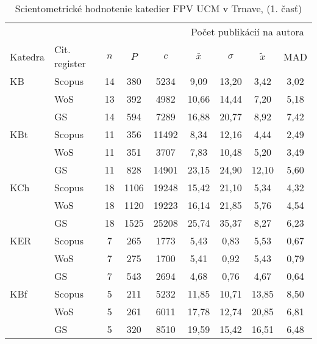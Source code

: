 \begin{table}
  \centering\small
  \caption[Hodnotenie FPV\,--\,počet publikácií na autora]{Scientometrické hodnotenie katedier FPV UCM v Trnave, (1. časť)}
  \label{tab:1-staff.results}
  \begin{tabularx}{\textwidth}{lXc@{\hspace{2.5em}}c@{\hspace{2.5em}}c@{\hspace{3.5em}}cccc}
  \toprule\noalign{\vspace{.3ex}}
         &        &   &     &      & \multicolumn{4}{c}{Počet publikácií na autora}  \\
 Katedra & Cit. register  & $n$   & $P$     &  $c$     & $\bar{x}$      & $\sigma$  & $\tilde{x}$   & MAD  \\[0.3ex]
\midrule\noalign{\vspace{.5ex}}
 KB   & Scopus & 14 & 380  & 5234  & 9,09          & 13,20 & 3,42  & 3,02 \\
      & WoS    & 13 & 392  & 4982  & 10,66         & 14,44 & 7,20  & 5,18 \\
      & GS     & 14 & 594  & 7289  & 16,88         & 20,77 & 8,92  & 7,42 \\[3ex]
 KBt  & Scopus & 11 & 356  & 11492 & 8,34          & 12,16 & 4,44  & 2,49 \\
      & WoS    & 11 & 351  & 3707  & 7,83          & 10,48 & 5,20  & 3,49 \\
      & GS     & 11 & 828  & 14901 & 23,15         & 24,90 & 12,10 & 5,60 \\[3ex]
 KCh  & Scopus & 18 & 1106 & 19248 & 15,42         & 21,10 & 5,34  & 4,32 \\
      & WoS    & 18 & 1120 & 19223 & 16,14         & 21,85 & 5,76  & 4,54 \\
      & GS     & 18 & 1525 & 25208 & 25,74         & 35,37 & 8,27  & 6,23 \\[3ex]
 KER  & Scopus & 7  & 265  & 1773  & 5,43          & 0,83  & 5,53  & 0,67 \\
      & WoS    & 7  & 275  & 1700  & 5,41          & 0,92  & 5,43  & 0,79 \\
      & GS     & 7  & 543  & 2694  & 4,68          & 0,76  & 4,67  & 0,64 \\[3ex]
 KBf  & Scopus & 5  & 211  & 5232  & 11,85         & 10,71 & 13,85 & 8,50 \\
      & WoS    & 5  & 261  & 6011  & 17,78         & 12,74 & 20,85 & 6,81 \\
      & GS     & 5  & 320  & 8510  & 19,59         & 15,42 & 16,51 & 6,48 \\[3ex]

\end{tabularx}
\end{table}
